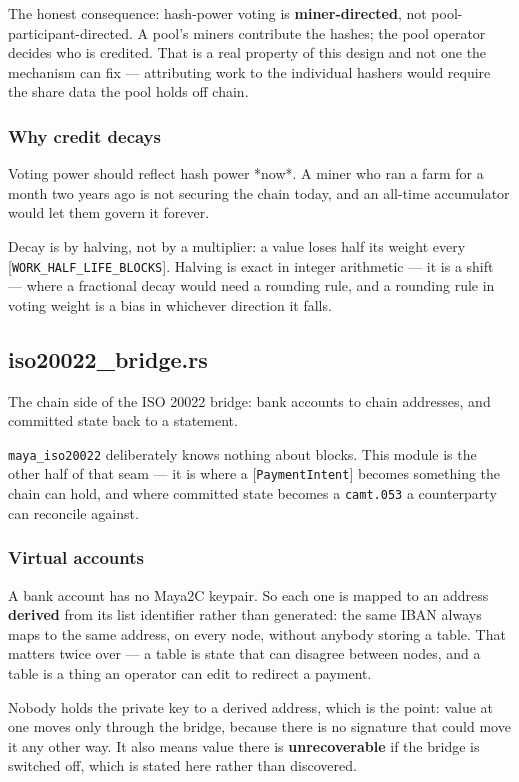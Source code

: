 \documentclass[11pt,a4paper]{article}
\begin{document}
The honest consequence: hash-power voting is \textbf{miner-directed}, not
pool-participant-directed. A pool's miners contribute the hashes; the pool
operator decides who is credited. That is a real property of this design and
not one the mechanism can fix — attributing work to the individual hashers
would require the share data the pool holds off chain.

\subsubsection{Why credit decays}

Voting power should reflect hash power *now*. A miner who ran a farm for a
month two years ago is not securing the chain today, and an all-time
accumulator would let them govern it forever.

Decay is by halving, not by a multiplier: a value loses half its weight
every [\texttt{WORK\_HALF\_LIFE\_BLOCKS}]. Halving is exact in integer arithmetic —
it is a shift — where a fractional decay would need a rounding rule, and a
rounding rule in voting weight is a bias in whichever direction it falls.

\subsection{iso20022\_bridge.rs}
The chain side of the ISO 20022 bridge: bank accounts to chain addresses,
and committed state back to a statement.

\texttt{maya\_iso20022} deliberately knows nothing about blocks. This module is the
other half of that seam — it is where a [\texttt{PaymentIntent}] becomes something
the chain can hold, and where committed state becomes a \texttt{camt.053} a
counterparty can reconcile against.

\subsubsection{Virtual accounts}

A bank account has no Maya2C keypair. So each one is mapped to an address
\textbf{derived} from its list identifier rather than generated: the same IBAN
always maps to the same address, on every node, without anybody storing a
table. That matters twice over — a table is state that can disagree between
nodes, and a table is a thing an operator can edit to redirect a payment.

Nobody holds the private key to a derived address, which is the point:
value at one moves only through the bridge, because there is no signature
that could move it any other way. It also means value there is
\textbf{unrecoverable} if the bridge is switched off, which is stated here rather
than discovered.
\end{document}
